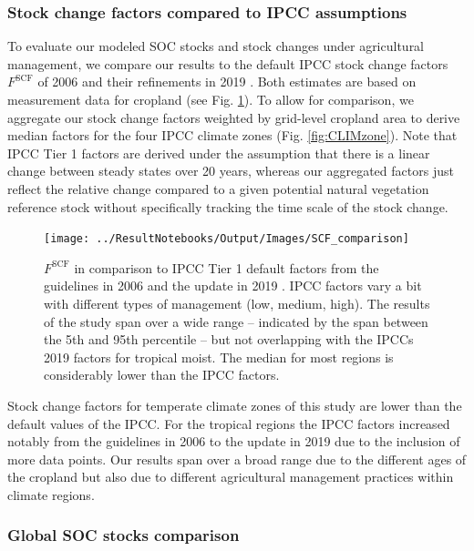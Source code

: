 \documentclass[gc, manuscript]{copernicus}
\begin{document}
\hypertarget{sec:ipcccompare}{%
\subsubsection{Stock change factors compared to IPCC assumptions}\label{sec:ipcccompare}}

To evaluate our modeled SOC stocks and stock changes under agricultural management, we compare our results to the default IPCC stock change factors \(F^{\mathrm{SCF}}\) of 2006 \citep{lasco_cropland_in_ipcc_2006} and their refinements in 2019 \citep{ogle_cropland_in_ipcc_2019}. Both estimates are based on measurement data for cropland (see Fig. \ref{fig:SCFglo}). To allow for comparison, we aggregate our stock change factors weighted by grid-level cropland area to derive median factors for the four IPCC climate zones (Fig. \ref{fig:CLIMzone}). Note that IPCC Tier 1 factors are derived under the assumption that there is a linear change between steady states over 20 years, whereas our aggregated factors just reflect the relative change compared to a given potential natural vegetation reference stock without specifically tracking the time scale of the stock change.

\begin{figure}[h]
\texttt{[image: ../ResultNotebooks/Output/Images/SCF\_comparison]} \caption{$F^{\mathrm{SCF}}$ in comparison to IPCC Tier 1 default factors from the guidelines in 2006 \citep{lasco_cropland_in_ipcc_2006} and the update in 2019 \citep{ogle_cropland_in_ipcc_2019}. IPCC factors vary a bit with different types of management (low, medium, high). The results of the study span over a wide range -- indicated by the span between the 5th and 95th percentile -- but not overlapping with the IPCCs 2019 factors for tropical moist. The median for most regions is considerably lower than the IPCC factors.}\label{fig:SCFglo}
\end{figure}

Stock change factors for temperate climate zones of this study are lower than the default values of the IPCC. For the tropical regions the IPCC factors increased notably from the guidelines in 2006 \citep{lasco_cropland_in_ipcc_2006} to the update in 2019 \citep{ogle_cropland_in_ipcc_2019} due to the inclusion of more data points. Our results span over a broad range due to the different ages of the cropland but also due to different agricultural management practices within climate regions.

\hypertarget{global-soc-stocks-comparison}{%
\subsubsection{Global SOC stocks comparison}\label{global-soc-stocks-comparison}}
\end{document}
